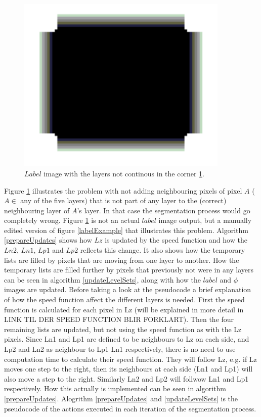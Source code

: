 \begin{figure}[h!]
\centering
\includegraphics[width=0.90\textwidth]{implemented/labelWithNoEdge}
\caption{$Label$ image with the layers not continous in the corner \ref{labelWithNoEdge}.}
\label{labelWithNoEdge}
\end{figure}

Figure \ref{labelWithNoEdge} illustrates the problem with not adding neighbouring pixels of pixel $A$ ($A \in$ any of the five layers) that is not part of any layer to the (correct) neighbouring layer of $A$'s layer. In that case the segmentation process would go completely wrong. Figure \ref{labelWithNoEdge} is not an actual $label$ image output, but a manually edited version of figure \ref{labelExample} that illustrates this problem. Algorithm \ref{prepareUpdates} shows how $Lz$ is updated by the speed function and how the $Ln2$, $Ln1$, $Lp1$ and $Lp2$ reflects this change. It also shows how the temporary lists are filled by pixels that are moving from one layer to another. How the temporary lists are filled further by pixels that previously not were in any layers can be seen in algorithm \ref{updateLevelSets}, along with how the $label$ and $\phi$ images are updated.
Before taking a look at the pseudocode a brief explanation of how the speed function affect the different layers is needed. First the speed function is calculated for each pixel in Lz (will be explained in more detail in LINK TIL DER SPEED FUNCTION BLIR FORKLART). Then the four remaining lists are updated, but not using the speed function as with the Lz pixels. Since Ln1 and Lp1 are defined to be neighbours to Lz on each side, and Lp2 and Ln2 as neighbour to Lp1 Ln1 respectively, there is no need to use computation time to calculate their speed function. They will follow Lz, e.g. if Lz moves one step to the right, then its neighbours at each side (Ln1 and Lp1) will also move a step to the right. Similarly Ln2 and Lp2 will follwow Ln1 and Lp1 respectively. How this actually is implemented can be seen in algorithm \ref{prepareUpdates}. Alogrithm \ref{prepareUpdates} and \ref{updateLevelSets} is the pseudocode of the actions executed in each iteration of the segmentation process.

